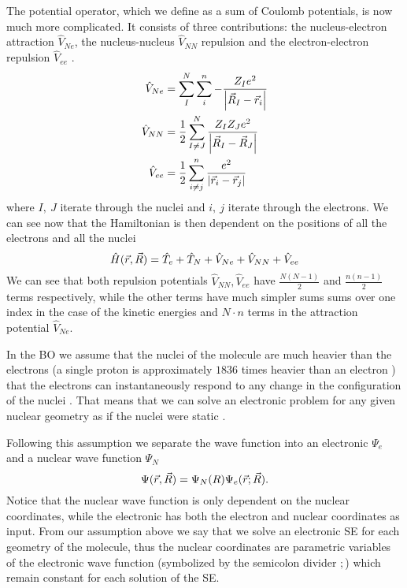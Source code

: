 \documentclass[../master_thesis.tex]{subfiles}
\begin{document}
The potential operator, which we define as a sum of Coulomb potentials, is now much more
complicated. It consists of three contributions: the nucleus-electron attraction
$\hat{V}_{Ne}$, the nucleus-nucleus $\hat{V}_{NN}$ repulsion and the electron-electron
repulsion $\hat{V}_{ee}$ \cite{Cramer:2004}.
\begin{align}
  \hat{V}_{Ne} &= \sum^N_I\sum^n_{i}-\frac{Z_Ie^2}{\abs{\vec{R}_I - \vec{r}_i}}\\
  \hat{V}_{NN} &= \frac{1}{2}\sum^N_{I \neq J}\frac{Z_IZ_Je^2}{\abs{\vec{R}_I - \vec{R}_J}}\\
  \hat{V}_{ee} &= \frac{1}{2}\sum^n_{i \neq j} \frac{e^2}{\abs{\vec{r}_i - \vec{r}_j}}
\end{align}
where $I,\ J$ iterate through the nuclei and $i, \ j$ iterate through the electrons.
We can see now that the Hamiltonian is then dependent on the positions of all the electrons and all
the nuclei \cite{Jensen:2017}
\begin{equation}
  \hat{H}(\vec{r}, \vec{R}) = \hat{T}_e + \hat{T}_N + \hat{V}_{Ne} +\hat{V}_{NN} + \hat{V}_{ee}
\end{equation}
We can see that both repulsion potentials $\hat{V}_{NN}, \hat{V}_{ee}$ have $\frac{N(N - 1)}{2}$ and $\frac{n(n - 1)}{2}$ terms
 respectively, while the other terms have much simpler sums {sums over one index in the case of the
kinetic energies and $N\cdot n$ terms in the attraction potential $\hat{V}_{Ne}$}.

In the \ac{BO}  we assume that the nuclei of the molecule are much heavier
than the electrons (a single proton is approximately $1836$ times heavier
than an electron \cite{NIST:2019}) that the electrons can instantaneously respond to
any change in the configuration of the nuclei \cite{Atkins:2011}. That means that we can solve an
electronic problem for any given nuclear geometry as if the nuclei were static
\cite{Cramer:2004, Jensen:2017, Atkins:2014}.

Following this  assumption we separate the wave function into an electronic
$\Psi_e$ and a nuclear wave function $\Psi_N$
\begin{equation}
  \Psi(\vec{r}, \vec{R}) = \Psi_N(R)\Psi_e(\vec{r}; \vec{R}).
\end{equation}
Notice that the nuclear wave function is only dependent on the nuclear coordinates,
while the electronic has both the electron and nuclear coordinates as input. From
our assumption above we say that we solve an electronic \ac{SE} for each geometry
of the molecule, thus the nuclear coordinates  are parametric variables of
the electronic wave function (symbolized by the semicolon divider $;$) which remain
constant for each solution of the \ac{SE}.
\end{document}
